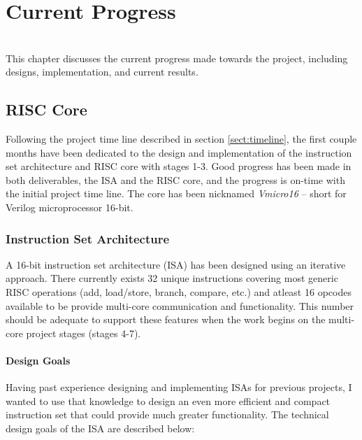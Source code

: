 \chapter{Current Progress}
{%
\startcontents[chapters]
}
\noindent\\
This chapter discusses the current progress made towards the project, including designs, implementation, and current results.

\section{RISC Core}
Following the project time line described in section \ref{sect:timeline}, the first couple months have been dedicated to the design and implementation of the instruction set architecture and RISC core with stages 1-3. Good progress has been made in both deliverables, the ISA and the RISC core, and the progress is on-time with the initial project time line. The core has been nicknamed \textit{Vmicro16} -- short for Verilog microprocessor 16-bit.

\subsection{Instruction Set Architecture}
A 16-bit instruction set architecture (ISA) has been designed using an iterative approach. There currently exists 32 unique instructions covering most generic RISC operations (add, load/store, branch, compare, etc.) and atleast 16 opcodes available to be provide multi-core communication and functionality. This number should be adequate to support these features when the work begins on the multi-core project stages (stages 4-7).

\subsubsection{Design Goals}
Having past experience designing and implementing ISAs for previous projects, I wanted to use that knowledge to design an even more efficient and compact instruction set that could provide much greater functionality. The technical design goals of the ISA are described below:


